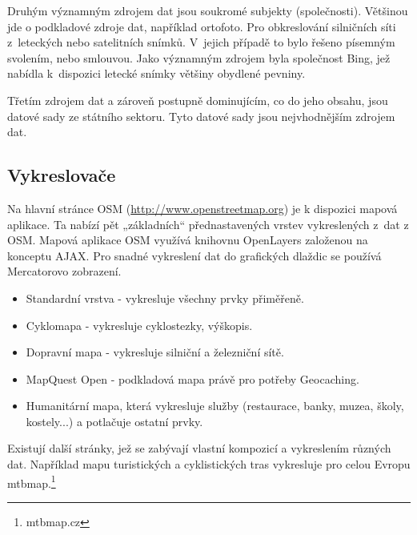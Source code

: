 Druhým významným zdrojem dat jsou soukromé subjekty (společnosti).
Většinou jde o podkladové zdroje dat, například ortofoto. Pro obkreslování
silničních síti z~leteckých nebo satelitních snímků. V~jejich případě to
bylo řešeno písemným svolením, nebo smlouvou. Jako významným zdrojem byla
společnost Bing, jež nabídla k~dispozici letecké snímky většiny
obydlené pevniny. 

Třetím zdrojem dat a zároveň postupně dominujícím, co do jeho obsahu, jsou
datové sady ze státního sektoru. Tyto datové sady jsou nejvhodnějším zdrojem
dat.

\subsection{Vykreslovače}
\label{Vykreslovače}
Na hlavní stránce OSM (\url{http://www.openstreetmap.org}) je k dispozici mapová aplikace. Ta nabízí pět
„základních“ přednastavených vrstev vykreslených z~dat z OSM. Mapová
aplikace OSM využívá knihovnu OpenLayers založenou na konceptu AJAX.
Pro snadné vykreslení dat do grafických dlaždic se používá Mercatorovo
zobrazení.

\begin{itemize}

  \item Standardní vrstva - vykresluje všechny prvky přiměřeně.
  \item Cyklomapa - vykresluje cyklostezky, výškopis. 
  \item Dopravní mapa - vykresluje silniční a železniční sítě.
  \item MapQuest Open - podkladová mapa právě pro potřeby 
    Geocaching.
  \item Humanitární mapa, která vykresluje služby (restaurace, banky, muzea, 
  školy, kostely...)  a potlačuje ostatní prvky. 

\end{itemize}

Existují další stránky, jež se zabývají vlastní kompozicí a vykreslením
různých dat. Například mapu turistických a cyklistických tras vykresluje
pro celou Evropu mtbmap.\footnote{mtbmap.cz}

